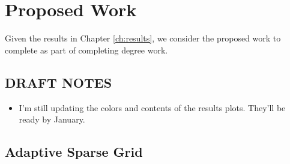 
\chapter{Proposed Work} %

\label{ch:proposed} %


Given the results in Chapter \ref{ch:results}, we consider the proposed work to complete as part of completing
degree work.

\section{DRAFT NOTES}
\begin{itemize}
  \item I'm still updating the colors and contents of the results plots.  They'll be ready by January.
\end{itemize}

\section{Adaptive Sparse Grid}

